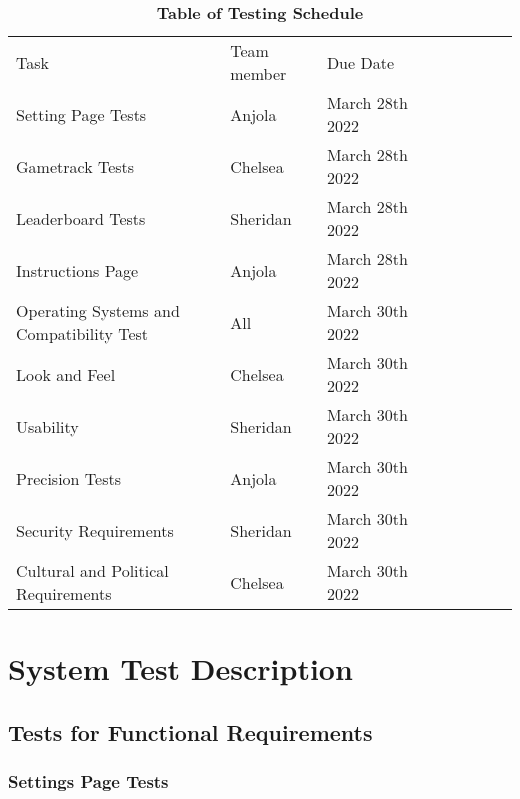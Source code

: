 \documentclass[12pt, titlepage]{article}
\begin{document}
\begin{table}[H]
\caption{\textbf{Table of Testing Schedule}} \label{Table}
\begin{tabular}{|l|l|l|llllll}
\cline{1-3}
Task                                     & Team member & Due Date        &  &  &  &  &  &  \\ \cline{1-3}
Setting Page Tests                       & Anjola      & March 28th 2022 &  &  &  &  &  &  \\ \cline{1-3}
Gametrack Tests                          & Chelsea     & March 28th 2022 &  &  &  &  &  &  \\ \cline{1-3}
Leaderboard Tests                        & Sheridan    & March 28th 2022 &  &  &  &  &  &  \\ \cline{1-3}
Instructions Page                        & Anjola      & March 28th 2022 &  &  &  &  &  &  \\ \cline{1-3}
Operating Systems and Compatibility Test & All         & March 30th 2022 &  &  &  &  &  &  \\ \cline{1-3}
Look and Feel                            & Chelsea     & March 30th 2022 &  &  &  &  &  &  \\ \cline{1-3}
Usability                                & Sheridan    & March 30th 2022 &  &  &  &  &  &  \\ \cline{1-3}
Precision Tests                          & Anjola      & March 30th 2022 &  &  &  &  &  &  \\ \cline{1-3}
Security Requirements                    & Sheridan    & March 30th 2022 &  &  &  &  &  &  \\ \cline{1-3}
Cultural and Political Requirements      & Chelsea     & March 30th 2022 &  &  &  &  &  &  \\ \cline{1-3}
\end{tabular}
\end{table}

\section{System Test Description}




	
\subsection{Tests for Functional Requirements}

\subsubsection{Settings Page Tests}
	
\end{document}
